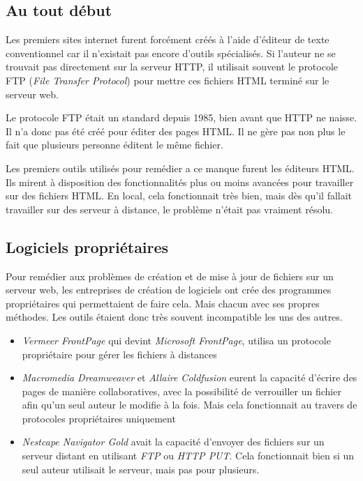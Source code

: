 \documentclass[a4paper, 11pt]{article}
\begin{document}
{	\subsection{Au tout début}
	
		Les premiers sites internet furent forcément créés à l'aide d'éditeur de texte conventionnel car il n'existait pas encore d'outils spécialisés. Si l'auteur ne se trouvait pas directement sur la serveur HTTP, il utilisait souvent le protocole FTP (\emph{File Transfer Protocol}) pour mettre ces fichiers HTML terminé sur le serveur web. 

		Le protocole FTP était un standard depuis 1985, bien avant que HTTP ne naisse. Il n'a donc pas été créé pour éditer des pages HTML. Il ne gère pas non plus le fait que plusieurs personne éditent le même fichier. 

		Les premiers outils utilisés pour remédier a ce manque furent les éditeurs HTML. Ils mirent à disposition des fonctionnalités plus ou moins avancées pour travailler sur des fichiers HTML. En local, cela fonctionnait très bien, mais dès qu'il fallait travailler sur des serveur à distance, le problème n'était pas vraiment résolu.

	\subsection{Logiciels propriétaires}
	
		Pour remédier aux problèmes de création et de mise à jour de fichiers sur un serveur web, les entreprises de création de logiciels ont crée des programmes propriétaires qui permettaient de faire cela. Mais chacun avec ses propres méthodes. Les outils étaient donc très souvent incompatible les uns des autres. 
		
		\begin{itemize}
			\item \emph{Vermeer FrontPage} qui devint \emph{Microsoft FrontPage}, utilisa un protocole propriétaire pour gérer les fichiers à distances	
			\item 		\emph{Macromedia Dreamweaver} et \emph{Allaire Coldfusion} eurent la capacité d'écrire des pages de manière collaboratives, avec la possibilité de verrouiller un fichier afin qu'un seul auteur le modifie à la fois. Mais cela fonctionnait au travers de protocoles propriétaires uniquement
			\item 		\emph{Nestcape Navigator Gold} avait la capacité d'envoyer des fichiers sur un serveur distant en utilisant \emph{FTP} ou \emph{HTTP PUT}. Cela fonctionnait bien si un seul auteur utilisait le serveur, mais pas pour plusieurs.
		\end{itemize}
		
}
\end{document}
